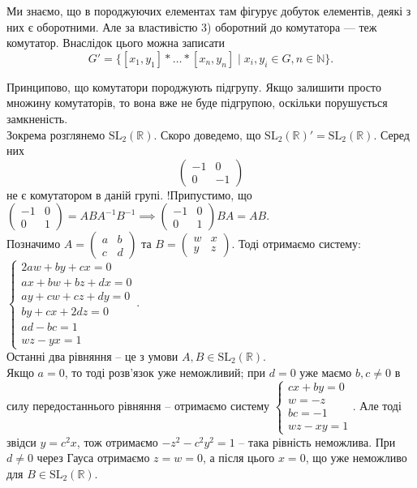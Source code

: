\documentclass{math_library}
\begin{document}
\begin{remark}
Ми знаємо, що в породжуючих елементах там фігурує добуток елементів, деякі з них є оборотними. Але за властивістю 3) оборотний до комутатора --- теж комутатор. Внаслідок цього можна записати 
\[
G' = \{ [x_1,y_1]*\dots*[x_n,y_n] \mid x_i,y_i \in G, n \in \mathbb{N} \}.
\]
\end{remark}

\begin{remark}
Принципово, що комутатори породжують підгрупу. Якщо залишити просто множину комутаторів, то вона вже не буде підгрупою, оскільки порушується замкненість.
\bigskip \\
Зокрема розглянемо $\mathrm{SL}_2(\mathbb{R})$. Скоро доведемо, що $\mathrm{SL}_2(\mathbb{R})' = \mathrm{SL}_2(\mathbb{R})$. Серед них
\[ 
\begin{pmatrix}
-1 & 0 \\
0 & -1
\end{pmatrix}
\]
не є комутатором в даній групі.
\iffalse
!Припустимо, що $\begin{pmatrix}
-1 & 0 \\
0 & 1
\end{pmatrix} = ABA^{-1}B^{-1} \implies \begin{pmatrix}
-1 & 0 \\
0 & 1
\end{pmatrix} BA = AB$.\\
Позначимо $A = \begin{pmatrix}
a & b \\
c & d
\end{pmatrix}$ та $B = \begin{pmatrix}
w & x \\
y & z
\end{pmatrix}$. Тоді отримаємо систему:\\
$\begin{cases} 
2aw + by + cx = 0 \\
ax + bw + bz + dx = 0 \\
ay + cw + cz + dy = 0 \\
by + cx + 2dz = 0 \\
ad - bc = 1 \\
wz - yx = 1
\end{cases}$.\\
Останні два рівняння -- це з умови $A,B \in \mathrm{SL}_2(\mathbb{R})$.\\
Якщо $a = 0$, то тоді розв'язок уже неможливий; при $d = 0$ уже маємо $b,c \neq 0$ в силу передостаннього рівняння -- отримаємо систему $\begin{cases} cx + by = 0 \\ w = -z \\ bc = -1 \\ wz - xy = 1 \end{cases}$. Але тоді звідси $y = c^2 x$, тож отримаємо $-z^2 - c^2y^2 = 1$ -- така рівність неможлива. При $d \neq 0$ через Гауса отримаємо $z = w = 0$, а після цього $x = 0$, що уже неможливо для $B \in \mathrm{SL}_2(\mathbb{R})$.\\

\end{remark}
\end{document}
